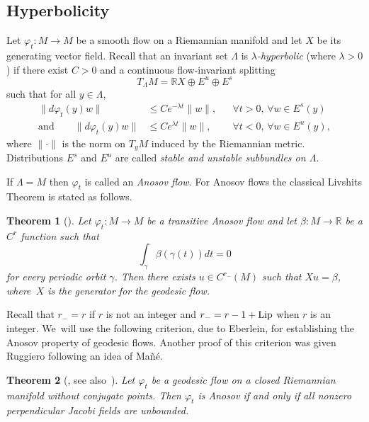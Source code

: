 \documentclass[JEP,XML,SOM,Unicode,NoFloatCountersInSection]{cedram}
\newtheorem{theorem}{Theorem}[section]
\theoremstyle{definition}
\newcommand{\field}[1]{\mathbb{#1}}
\newcommand{\R}{\field{R}}
\let\phi\varphi
\renewcommand{\>}{{\rangle}}
\newcommand{\<}{{\langle}}
\begin{document}
\subsection{Hyperbolicity} Let $\phi_t\colon M\to M$ be a smooth flow on a Riemannian manifold and let $X$ be its generating vector field.
Recall that an invariant set $\Lambda$ is \textit{$\lambda$-hyperbolic} (where $\lambda>0$) if there exist $C>0$ and a continuous flow-invariant splitting
\begin{equation*}
T_\Lambda M = \mathbb R X\oplus E^u\oplus E^s
\end{equation*}
such that for all $y\in\Lambda$,
\begin{equation}
\begin{aligned}
\|d\phi_t(y)w\|&\leq Ce^{-\lambda t}\|w\|, &&\forall t>0,\, \forall w\in E^s(y)\label{su_exp}\\
\text{and} \qquad\|d\phi_t(y)w\|&\leq Ce^{\lambda t}\|w\|, &&\forall t<0,\, \forall w\in E^u(y),
\end{aligned}
\end{equation}
where $\|{\cdot}\|$ is the norm on $T_yM$ induced by the Riemannian metric.
Distributions $E^s$ and $E^u$ are called \textit{stable and unstable subbundles on $\Lambda$}.

If $\Lambda=M$ then $\phi_t$ is called an {\it Anosov flow.} For Anosov flows the classical Livshits Theorem is stated as follows.
\begin{theorem}[\cite{L71, LMM86}]
\label{Liv}
Let $\varphi_t\colon M\to M$ be a transitive Anosov flow and let $\beta\colon M\to\R$ be a $C^r$ function such that
\[
\int_\gamma\beta(\gamma(t))dt=0
\]
for every periodic orbit $\gamma$. Then there exists $u\in C^{r_-}(M)$ such that $Xu=\beta$, where~$X$ is the generator for the geodesic flow.
\end{theorem}

Recall that $r_-=r$ if $r$ is not an integer and $r_-=r-1+\textup{Lip}$ when $r$ is an integer. We~will use the following criterion, due to Eberlein, for establishing the Anosov property of geodesic flows. Another proof of this criterion was given Ruggiero \cite{R07} following an idea of Mañé.

\begin{theorem}[\cite{E73}, see also~\cite{R07}]
\label{EberleinAnosov}
Let $\phi_t$ be a geodesic flow on a closed Riemannian
manifold without conjugate points. Then $\phi_t$ is Anosov if and only if all nonzero perpendicular Jacobi fields are unbounded. \end{theorem}
\end{document}
